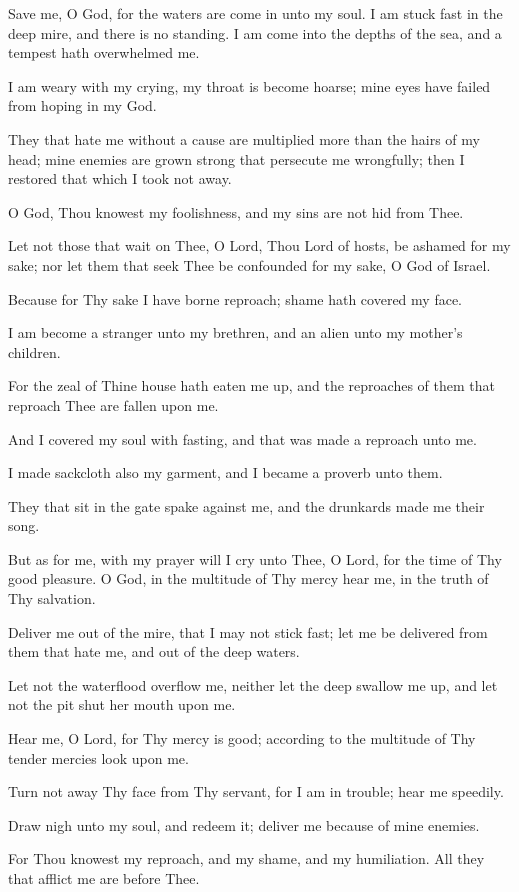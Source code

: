 Save me, O God, for the waters are come in unto my soul. I am stuck fast in the deep mire, and there is no standing. I am come into the depths of the sea, and a tempest hath overwhelmed me.

I am weary with my crying, my throat is become hoarse; mine eyes have failed from hoping in my God.

They that hate me without a cause are multiplied more than the hairs of my head; mine enemies are grown strong that persecute me wrongfully; then I restored that which I took not away.

O God, Thou knowest my foolishness, and my sins are not hid from Thee.

Let not those that wait on Thee, O Lord, Thou Lord of hosts, be ashamed for my sake; nor let them that seek Thee be confounded for my sake, O God of Israel.

Because for Thy sake I have borne reproach; shame hath covered my face.

I am become a stranger unto my brethren, and an alien unto my mother's children.

For the zeal of Thine house hath eaten me up, and the reproaches of them that reproach Thee are fallen upon me.

And I covered my soul with fasting, and that was made a reproach unto me.

I made sackcloth also my garment, and I became a proverb unto them.

They that sit in the gate spake against me, and the drunkards made me their song.

But as for me, with my prayer will I cry unto Thee, O Lord, for the time of Thy good pleasure. O God, in the multitude of Thy mercy hear me, in the truth of Thy salvation.

Deliver me out of the mire, that I may not stick fast; let me be delivered from them that hate me, and out of the deep waters.

Let not the waterflood overflow me, neither let the deep swallow me up, and let not the pit shut her mouth upon me.

Hear me, O Lord, for Thy mercy is good; according to the multitude of Thy tender mercies look upon me.

Turn not away Thy face from Thy servant, for I am in trouble; hear me speedily.

Draw nigh unto my soul, and redeem it; deliver me because of mine enemies.

For Thou knowest my reproach, and my shame, and my humiliation. All they that afflict me are before Thee.


